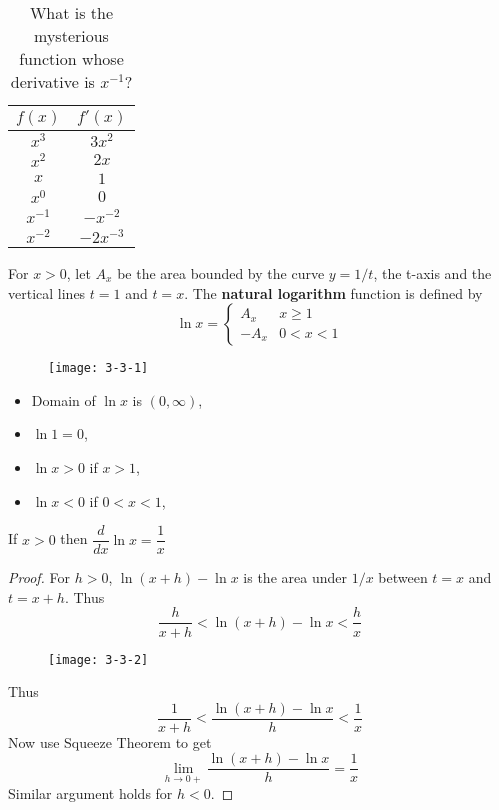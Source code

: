 \documentclass[../main.tex]{subfiles}
\begin{document}
\begin{table}[H]
\begin{tabular}{c|c}
$f(x)$ & $f'(x)$ \\
\hline
$x^3$ & $3 x^2$ \\
$x^2$ & $2 x$ \\
$x$ & $1$ \\
$x^0$ & $0$ \\
$x^{-1}$ & $-x^{-2}$ \\
$x^{-2}$ & $-2x^{-3}$
\end{tabular}
\caption{What is the mysterious function whose derivative is $x^{-1}$?}
\end{table}

\begin{definition}
    For $x>0$, let $A_x$ be the area bounded by the curve $y = 1/t$, the t-axis and the vertical lines $t=1$ and $t=x$. The \textbf{natural logarithm} function is defined by
    \[
        \ln x =
        \begin{cases}
            A_x & x \geq 1 \\
            -A_x & 0 < x < 1
        \end{cases}
    \]
\end{definition}

\begin{figure}[H]
    \centering
    \texttt{[image: 3-3-1]}
\end{figure}

\begin{multicols}{2}
\begin{itemize}
    \item Domain of $\ln x$ is $(0, \infty)$,
    \item $\ln 1 = 0$,
    \item $\ln x >0$ if $x>1$,
    \item $\ln x < 0$ if $0<x<1$,
\end{itemize}
\end{multicols}

\begin{theorem}
    If $x>0$ then $\dfrac{d}{dx} \ln x = \dfrac{1}{x}$
\end{theorem}

\begin{proof}
    For $h >0$, $\ln(x+h) - \ln x$ is the area under $1/x$ between $t = x$ and $t = x+h$. Thus
    \[
        \frac{h}{x+h} < \ln(x+h) - \ln x < \frac{h}{x}
    \]
    \begin{figure}[H]
        \centering
        \texttt{[image: 3-3-2]}
        \label{fig:ddxln}
    \end{figure}
    Thus
    \[
        \frac{1}{x+h} < \frac{\ln(x+h) - \ln x}{h} < \frac{1}{x}
    \]
    Now use Squeeze Theorem to get
    \[
        \lim_{h \to 0+} \frac{\ln(x+h) - \ln x}{h} = \frac{1}{x}
    \]
    Similar argument holds for $h<0$.

\end{proof}
\end{document}
